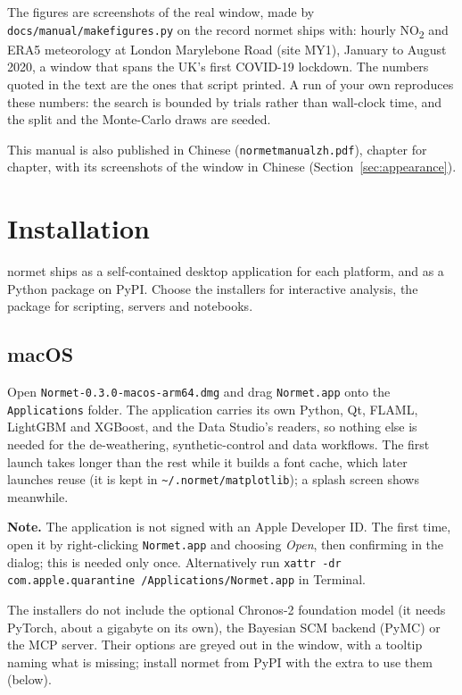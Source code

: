 \documentclass[11pt]{report}
\newcommand{\nm}{\textsf{normet}}
\newcommand{\codeunderscore}{\textunderscore\allowbreak}
\newcommand{\code}[1]{\texttt{\let\_\codeunderscore #1}}
\newcommand{\NOtwo}{NO\textsubscript{2}}
\newcommand{\note}[1]{\par\noindent\colorbox{codebg}{\parbox{0.97\linewidth}{\small\textbf{Note.} #1}}\par}
\begin{document}
The figures are screenshots of the real window, made by
\code{docs/manual/make\_figures.py} on the record \nm{} ships with: hourly \NOtwo{} and
ERA5 meteorology at London Marylebone Road (site MY1), January to August 2020, a window
that spans the UK's first COVID-19 lockdown. The numbers quoted in the text are the ones
that script printed. A run of your own reproduces these numbers: the search is bounded by trials rather than
wall-clock time, and the split and the Monte-Carlo draws are seeded.

This manual is also published in Chinese (\code{normet\_manual\_zh.pdf}), chapter for
chapter, with its screenshots of the window in Chinese (Section~\ref{sec:appearance}).

\chapter{Installation}\label{ch:install}

\nm{} ships as a self-contained desktop application for each platform, and as a Python
package on PyPI. Choose the installers for interactive analysis, the package for
scripting, servers and notebooks.

\section{macOS}
Open \code{Normet-0.3.0-macos-arm64.dmg} and drag \code{Normet.app} onto the
\code{Applications} folder. The application carries its own Python, Qt, FLAML, LightGBM
and XGBoost, and the Data Studio's readers, so nothing else is needed for the
de-weathering, synthetic-control and data workflows. The first launch takes longer than
the rest while it builds a font cache, which later launches reuse (it is kept in
\code{\textasciitilde/.normet/matplotlib}); a splash screen shows meanwhile.

\note{The application is not signed with an Apple Developer ID. The first time, open it
by right-clicking \code{Normet.app} and choosing \emph{Open}, then confirming in the
dialog; this is needed only once. Alternatively run
\code{xattr -dr com.apple.quarantine /Applications/Normet.app} in Terminal.}

The installers do not include the optional Chronos-2 foundation model (it needs PyTorch,
about a gigabyte on its own), the Bayesian SCM backend (PyMC) or the MCP server. Their
options are greyed out in the window, with a tooltip naming what is missing; install
\nm{} from PyPI with the extra to use them (below).
\end{document}
